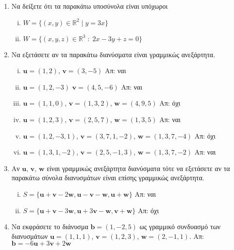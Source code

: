 \begin{enumerate}
  \item Να δείξετε ότι τα παρακάτω υποσύνολα είναι υπόχωροι
    \begin{enumerate}[(i)]
      \item $ W = \{ (x,y) \in \mathbb{R}^{2} \mid y = 3x \} $ 
      \item $ W = \{(x,y,z)\in \mathbb{R}^{3} \; : \; 2x-3y+z=0 \} $
    \end{enumerate}

  \item\label{ask:lineks} Να εξετάσετε αν τα παρακάτω διανύσματα είναι γραμμικώς 
    ανεξάρτητα.
    \begin{enumerate}[(i)]
      \item $ \mathbf{u} = (1,2) $, $ \mathbf{v} = (3,-5) $ \hfill Απ: ναι
      \item $ \mathbf{u} = (1,2,-3) $ $ \mathbf{v} = (4,5,-6) $ \hfill Απ: ναι
      \item $ \mathbf{u} = (1,1,0)$, $ \mathbf{v} = (1,3,2)$, $ \mathbf{w} = (4,9,5) $ 
        \hfill Απ: όχι 
      \item $ \mathbf{u} = (1,2,3)$, $ \mathbf{v} = (2,5,7)$, $ \mathbf{w} = (1,3,5) $ 
        \hfill Απ: ναι 
      \item $ \mathbf{u} = (1,2,-3,1) $, $ \mathbf{v} = (3,7,1,-2) $, $ \mathbf{w} =
        (1,3,7,-4) $ \hfill Απ: όχι
      \item $ \mathbf{u} = (1,3,1,-2) $, $ \mathbf{v} = (2,5,-1,3) $, $ \mathbf{w} =
        (1,3,7,-2) $ \hfill Απ: ναι
    \end{enumerate}

  \item Αν $ \mathbf{u} $, $ \mathbf{v} $, $ \mathbf{w} $ είναι γραμμικώς 
    ανεξάρτητα διανύσματα τότε να εξετάσετε αν τα παρακάτω σύνολα διανυσμάτων 
    είναι επίσης γραμμικώς ανεξάρτητα.
    \begin{enumerate}[(i)]
      \item $ S = \{ \mathbf{u} + \mathbf{v} - 2 \mathbf{w}, \mathbf{u} - \mathbf{v} -
        \mathbf{w}, \mathbf{u} + \mathbf{w} \} $ \hfill Απ: ναι 
      \item $ S = \{ \mathbf{u} + \mathbf{v} - 3 \mathbf{w}, \mathbf{u} + 3 \mathbf{v} -
        \mathbf{w}, \mathbf{v} + \mathbf{w}\}  $ \hfill Απ: όχι 
    \end{enumerate}

  \item\label{ask:eksart} Να εκφράσετε το διάνυσμα $ \mathbf{b} = (1,-2,5) $ ως γραμμικό 
    συνδυασμό των διανυσμάτων $ \mathbf{u} = (1,1,1)$, $ \mathbf{v} = (1,2,3)$, 
    $ \mathbf{w} = (2,-1,1) $.
    \hfill Απ: $ \mathbf{b} = -6 \mathbf{u} + 3 \mathbf{v} +2 \mathbf{w} $ 	


\end{enumerate}
